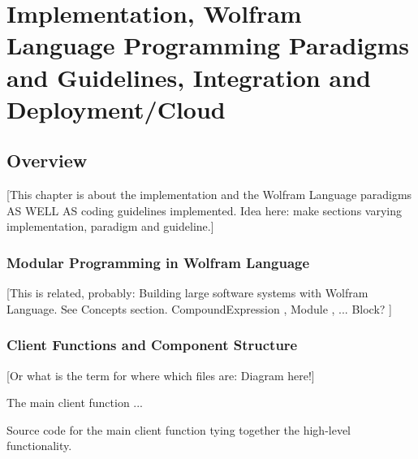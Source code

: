 \chapter{Implementation, Wolfram Language Programming Paradigms and Guidelines, Integration and Deployment/Cloud}
\label{cha:Implementation}

\section{Overview}

[This chapter is about the implementation and the Wolfram Language paradigms AS WELL AS coding guidelines implemented. Idea here: make sections varying implementation, paradigm and guideline.]

\subsection{Modular Programming in Wolfram Language} \label{modular-programming}

[This is related, probably: Building large software systems with Wolfram Language. See Concepts section. CompoundExpression \cite{noauthor_compoundexpressionwolfram_nodate}, Module \cite{noauthor_module_nodate}, ... Block? \cite{noauthor_blockwolfram_nodate}]

\subsection{Client Functions and Component Structure}

[Or what is the term for where which files are: Diagram here!]

The main client function ...

\begin{program}
\caption{Source code for the main client function tying together the high-level functionality.}
\label{prog:AlgExample}
\end{program}

